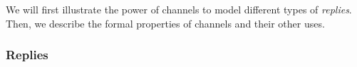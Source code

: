 We will first illustrate the power of channels
to model different types of \emph{replies}.
Then, we describe the formal properties of channels and their other uses.










\subsubsection{Replies}

